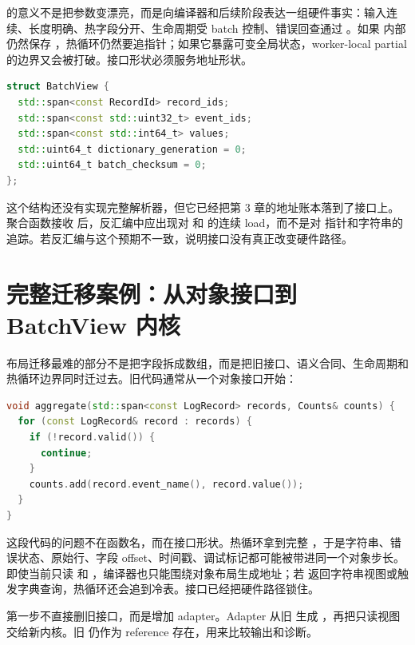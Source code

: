  的意义不是把参数变漂亮，而是向编译器和后续阶段表达一组硬件事实：输入连续、长度明确、热字段分开、生命周期受 batch 控制、错误回查通过 。如果  内部仍然保存 ，热循环仍然要追指针；如果它暴露可变全局状态，worker-local partial 的边界又会被打破。接口形状必须服务地址形状。

\begin{lstlisting}[language=C++,caption={BatchView 应表达连续热列和稳定身份}]
struct BatchView {
  std::span<const RecordId> record_ids;
  std::span<const std::uint32_t> event_ids;
  std::span<const std::int64_t> values;
  std::uint64_t dictionary_generation = 0;
  std::uint64_t batch_checksum = 0;
};
\end{lstlisting}

这个结构还没有实现完整解析器，但它已经把第 3 章的地址账本落到了接口上。聚合函数接收  后，反汇编中应出现对  和  的连续 load，而不是对  指针和字符串的追踪。若反汇编与这个预期不一致，说明接口没有真正改变硬件路径。

\section{完整迁移案例：从对象接口到 BatchView 内核}

布局迁移最难的部分不是把字段拆成数组，而是把旧接口、语义合同、生命周期和热循环边界同时迁过去。旧代码通常从一个对象接口开始：

\begin{lstlisting}[language=C++,caption={旧接口把完整对象带进热循环}]
void aggregate(std::span<const LogRecord> records, Counts& counts) {
  for (const LogRecord& record : records) {
    if (!record.valid()) {
      continue;
    }
    counts.add(record.event_name(), record.value());
  }
}
\end{lstlisting}

这段代码的问题不在函数名，而在接口形状。热循环拿到完整 ，于是字符串、错误状态、原始行、字段 offset、时间戳、调试标记都可能被带进同一个对象步长。即使当前只读  和 ，编译器也只能围绕对象布局生成地址；若  返回字符串视图或触发字典查询，热循环还会追到冷表。接口已经把硬件路径锁住。

第一步不直接删旧接口，而是增加 adapter。Adapter 从旧  生成 ，再把只读视图交给新内核。旧  仍作为 reference 存在，用来比较输出和诊断。


